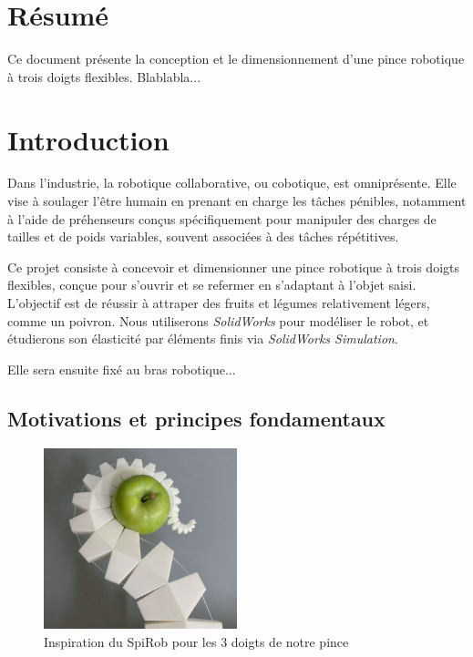 \documentclass[a4paper, 11pt]{report}
\begin{document}
\clearpage
\section*{Résumé}
Ce document présente la conception et le dimensionnement d'une pince robotique à trois doigts flexibles. Blablabla...

\clearpage
\tableofcontents
\clearpage

\section{Introduction}

    Dans l'industrie, la robotique collaborative, ou cobotique, est omniprésente. Elle vise à soulager l’être humain en prenant en charge les tâches pénibles, notamment à l’aide de préhenseurs conçus spécifiquement pour manipuler des charges de tailles et de poids variables, souvent associées à des tâches répétitives. \cite{noauthor_cobotique_nodate}

    Ce projet consiste à concevoir et dimensionner une pince robotique à trois doigts flexibles, conçue pour s'ouvrir et se refermer en s'adaptant à l'objet saisi. L'objectif est de réussir à attraper des fruits et légumes relativement légers, comme un poivron. Nous utiliserons \textit{SolidWorks} pour modéliser le robot, et étudierons son élasticité par éléments finis via \textit{SolidWorks Simulation}.

    Elle sera ensuite fixé au bras robotique...

    \subsection{Motivations et principes fondamentaux}

        \begin{figure}
            \centering
            \includegraphics[width=0.5\textwidth]{Figures/pieuvre.png}
            \caption{Inspiration du SpiRob pour les 3 doigts de notre pince \cite{wang_spirobs_2025}}
            \label{fig:pieuvre}
        \end{figure}
    
\end{document}
